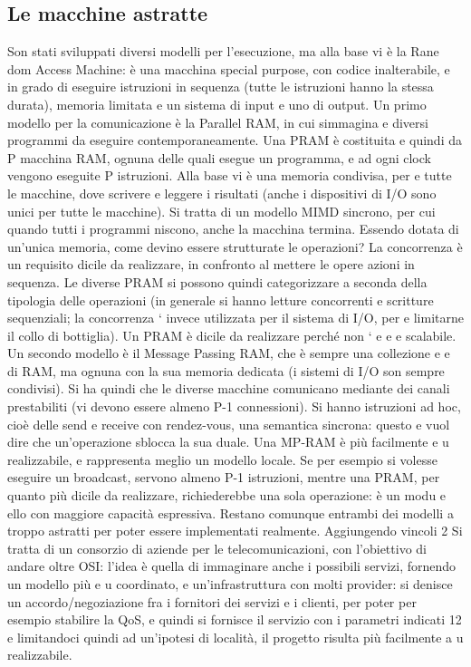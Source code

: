 \documentclass[a4paper,12pt]{article}
\begin{document}
\subsection{Le macchine astratte}
Son stati sviluppati diversi modelli per l'esecuzione, ma alla base vi è la Rane
dom Access Machine: è una macchina special purpose, con codice inalterabile,
e
in grado di eseguire istruzioni in sequenza (tutte le istruzioni hanno la stessa
durata), memoria limitata e un sistema di input e uno di output.
Un primo modello per la comunicazione è la Parallel RAM, in cui simmagina
e
diversi programmi da eseguire contemporaneamente. Una PRAM è costituita
e
quindi da P macchina RAM, ognuna delle quali esegue un programma, e ad ogni
clock vengono eseguite P istruzioni. Alla base vi è una memoria condivisa, per
e
tutte le macchine, dove scrivere e leggere i risultati (anche i dispositivi di I/O
sono unici per tutte le macchine). Si tratta di un modello MIMD sincrono, per
cui quando tutti i programmi niscono, anche la macchina termina. Essendo
dotata di un'unica memoria, come devino essere strutturate le operazioni? La
concorrenza è un requisito dicile da realizzare, in confronto al mettere le opere
azioni in sequenza. Le diverse PRAM si possono quindi categorizzare a seconda
della tipologia delle operazioni (in generale si hanno letture concorrenti e scritture sequenziali; la concorrenza `
invece utilizzata per il sistema di I/O, per
e
limitarne il collo di bottiglia). Un PRAM è dicile da realizzare perché non `
e
e
e
scalabile.
Un secondo modello è il Message Passing RAM, che è sempre una collezione
e
e
di RAM, ma ognuna con la sua memoria dedicata (i sistemi di I/O son sempre
condivisi). Si ha quindi che le diverse macchine comunicano mediante dei canali
prestabiliti (vi devono essere almeno P-1 connessioni). Si hanno istruzioni ad
hoc, cioè delle send e receive con rendez-vous, una semantica sincrona: questo
e
vuol dire che un'operazione sblocca la sua duale. Una MP-RAM è più facilmente
e u
realizzabile, e rappresenta meglio un modello locale. Se per esempio si volesse
eseguire un broadcast, servono almeno P-1 istruzioni, mentre una PRAM, per
quanto più dicile da realizzare, richiederebbe una sola operazione: è un modu
e
ello con maggiore capacità espressiva. Restano comunque entrambi dei modelli
a
troppo astratti per poter essere implementati realmente. Aggiungendo vincoli
2 Si tratta di un consorzio di aziende per le telecomunicazioni, con l'obiettivo di andare
oltre OSI: l'idea è quella di immaginare anche i possibili servizi, fornendo un modello più
e
u
coordinato, e un'infrastruttura con molti provider: si denisce un accordo/negoziazione fra i
fornitori dei servizi e i clienti, per poter per esempio stabilire la QoS, e quindi si fornisce il
servizio con i parametri indicati
12
e limitandoci quindi ad un'ipotesi di località, il progetto risulta più facilmente
a
u
realizzabile.
\end{document}
